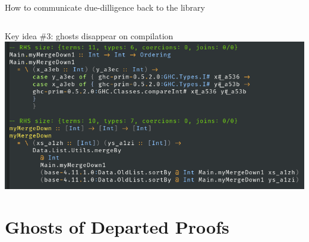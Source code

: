 \documentclass{beamer}
\begin{document}
\begin{frame}{How to communicate due-dilligence back to the library}
  \inputminted{haskell}{mergeghost3.hs}  
\end{frame}

\begin{frame}{Key idea \#3: ghosts disappear on compilation}
  \includegraphics[width=0.8\paperwidth]{simpl}
\end{frame}

  \section{Ghosts of Departed Proofs}   %

\begin{frame}{}\end{frame}
\usebackgroundtemplate{}
\end{document}
